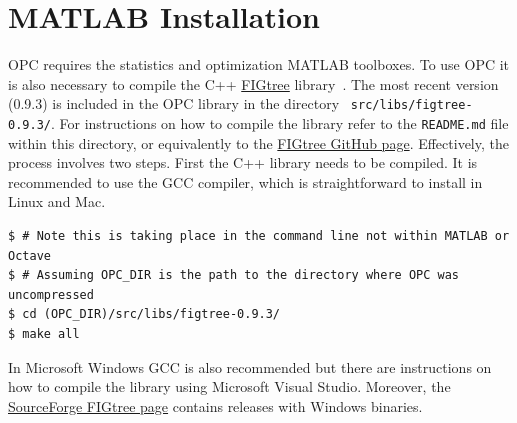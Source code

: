 \documentclass{book}
\begin{document}
%


\section{MATLAB Installation}

OPC requires the statistics and optimization MATLAB toolboxes. 
To use OPC it is also necessary
to compile the C++
\href{https://github.com/vmorariu/figtree}{FIGtree}
library~\cite{Morariu08}.
%
The most recent version (0.9.3) is included in the OPC library in the directory {\tt
src/libs/figtree-0.9.3/}. For instructions on how to compile the library
refer to the {\tt README.md} file within this directory, or equivalently
to the \href{https://github.com/vmorariu/figtree}{FIGtree GitHub page}.
Effectively, the process involves two steps. First the C++ library needs to be compiled.
It is recommended to use the GCC compiler, which is straightforward to install
in Linux and Mac.

%
\begin{verbatim}
$ # Note this is taking place in the command line not within MATLAB or Octave
$ # Assuming OPC_DIR is the path to the directory where OPC was uncompressed
$ cd (OPC_DIR)/src/libs/figtree-0.9.3/
$ make all
\end{verbatim}
%
\noindent
%
In Microsoft Windows GCC is also recommended but there are instructions on how
to compile the library using Microsoft Visual Studio. Moreover,
the \href{http://sourceforge.net/projects/figtree}{SourceForge FIGtree page}
contains releases with Windows binaries.

%
%
%
%
%
%
%
\end{document}
